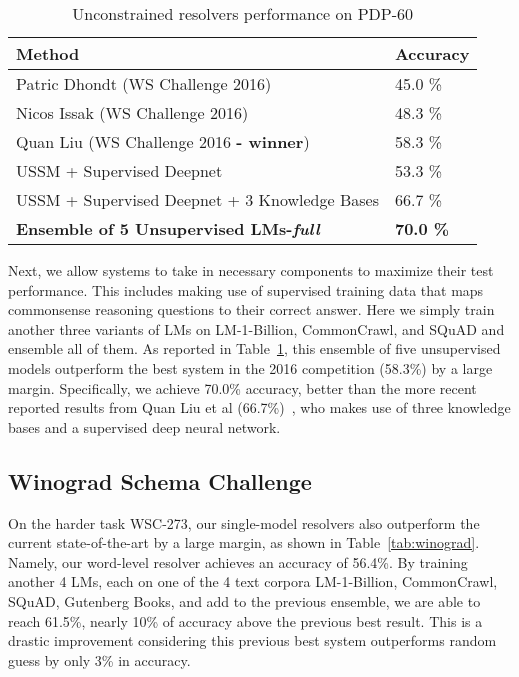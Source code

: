 \documentclass{article}
\begin{document}
\begin{table}[h!]
  \caption{Unconstrained resolvers performance on PDP-60}
  \label{tab:full}
  \centering\small
  \begin{tabular}{ll}
    \toprule
    Method & Accuracy \\
    \midrule
Patric Dhondt (WS Challenge 2016) & 45.0 \% \\
    Nicos Issak (WS Challenge 2016) & 48.3 \% \\
    Quan Liu (WS Challenge 2016 \textbf{- winner}) & 58.3 \% \\
    \midrule
    USSM + Supervised Deepnet &  53.3 \% \\
    USSM + Supervised Deepnet + 3 Knowledge Bases & 66.7 \% \\
    \midrule
    \textbf{Ensemble of 5 Unsupervised LMs-\emph{full}} & \textbf{70.0 \%} \\
    \bottomrule
  \end{tabular}
\end{table}

Next, we allow systems to take in necessary components to maximize their test performance. This includes making use of supervised training data that maps commonsense reasoning questions to their correct answer. Here we simply train another three variants of LMs on LM-1-Billion, CommonCrawl, and SQuAD and ensemble all of them. As reported in Table~\ref{tab:full}, this ensemble of five unsupervised models outperform the best system in the 2016 competition (58.3\%) by a large margin. Specifically, we achieve 70.0\% accuracy, better than the more recent reported results from Quan Liu et al (66.7\%)~\cite{quanliu16winograd}, who makes use of three knowledge bases and a supervised deep neural network.


\subsection{Winograd Schema Challenge}

On the harder task WSC-273, our single-model resolvers also outperform the current state-of-the-art by a large margin, as shown in Table~\ref{tab:winograd}. Namely, our word-level resolver achieves an accuracy of 56.4\%. By training another 4 LMs, each on one of the 4 text corpora LM-1-Billion, CommonCrawl, SQuAD, Gutenberg Books, and add to the previous ensemble, we are able to reach 61.5\%, nearly 10\% of accuracy above the previous best result. This is a drastic improvement considering this previous best system outperforms random guess by only 3\% in accuracy.
\end{document}
